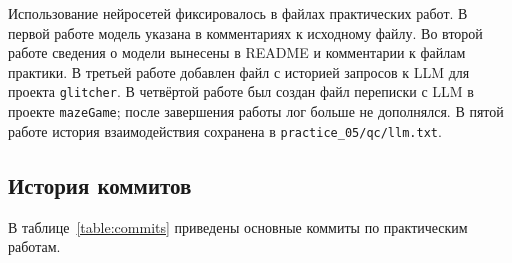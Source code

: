 Использование нейросетей фиксировалось в файлах практических работ. В первой работе модель указана в комментариях к исходному файлу. Во второй работе сведения о модели вынесены в README и комментарии к файлам практики. В третьей работе добавлен файл с историей запросов к LLM для проекта \texttt{glitcher}. В четвёртой работе был создан файл переписки с LLM в проекте \texttt{mazeGame}; после завершения работы лог больше не дополнялся. В пятой работе история взаимодействия сохранена в \texttt{practice_05/qc/llm.txt}.

\subsection{История коммитов}

В таблице~\ref{table:commits} приведены основные коммиты по практическим работам.

